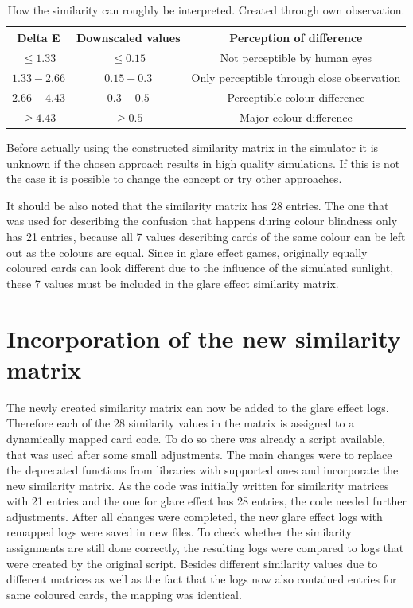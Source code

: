 \begin{table}[H]
	\centering
	
	\begin{tabular}{|c|c|c|}
		\hline
		Delta E & Downscaled values & Perception of difference \\
		\hline
		$\leq1.33$ & $\leq0.15$ & Not perceptible by human eyes\\
		$1.33-2.66$ &$0.15-0.3$  & Only perceptible through close observation \\
		$2.66-4.43$ & $0.3-0.5$ & Perceptible colour difference \\
		$\geq4.43$ &$\geq0.5$  & Major colour difference\\
		\hline
	\end{tabular}
	\caption[Tabelle kurz]{How the similarity can roughly be interpreted. Created through own observation.}
	\label{tab:percept}
\end{table}


Before actually using the constructed similarity matrix in the simulator it is unknown if the chosen approach results in high quality simulations. If this is not the case it is possible to change the concept or try other approaches. 

It should be also noted that the similarity matrix has 28 entries. The one that was used for describing the confusion that happens during colour blindness only has 21 entries, because all 7 values describing cards of the same colour can be left out as the colours are equal. Since in glare effect games, originally equally coloured cards can look different due to the influence of the simulated sunlight, these 7 values must be included in the glare effect similarity matrix.

\section{Incorporation of the new similarity matrix}
\label{incorporation_of_the_new_similarity_matrix}
The newly created similarity matrix can now be added to the glare effect logs. Therefore each of the 28 similarity values in the matrix is assigned to a dynamically mapped card code. To do so there was already a script available, that was used after some small adjustments. The main changes were to replace the deprecated functions from libraries with supported ones and incorporate the new similarity matrix. As the code was initially written for similarity matrices with 21 entries and the one for glare effect has 28 entries, the code needed further adjustments. After all changes were completed, the new glare effect logs with remapped logs were saved in new files. To check whether the similarity assignments are still done correctly, the resulting logs were compared to logs that were created by the original script. Besides different similarity values due to different matrices as well as the fact that the logs now also contained entries for same coloured cards, the mapping was identical. 


